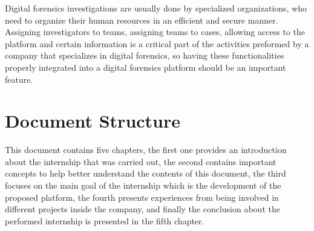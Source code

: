 Digital forensics investigations are usually done by specialized organizations, who need to organize their human resources in an efficient and secure manner.
Assigning investigators to teams, assigning teams to cases, allowing access to the platform and certain information is a critical part of the activities preformed by
a company that specializes in digital forensics, so having these functionalities properly integrated into a digital forensics platform should be an important feature.


\section{Document Structure}

This document contains five chapters, the first one provides an introduction about the internship that was carried out, 
the second contains important concepts to help better understand the contents of this document, the third focuses on the main goal of the internship which is the development
of the proposed platform, the fourth presents experiences from being involved in different projects inside the company,
and finally the conclusion about the performed internship is presented in the fifth chapter.

